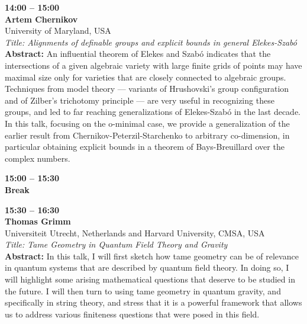 \documentclass[10pt,a4paper]{article}
\begin{document}
\begin{tcolorbox}[talkbox]
\textbf{14:00 -- 15:00} \\
\textbf{Artem Chernikov} \\
University of Maryland, USA \\
\textit{Title: Alignments of definable groups and explicit bounds in general Elekes-Szabó} \\
\textbf{Abstract:} An influential theorem of Elekes and Szabó indicates that the intersections of a given algebraic variety with large finite grids of points may have maximal size only for varieties that are closely connected to algebraic groups.  Techniques from model theory --- variants of Hrushovski's group configuration and of Zilber's trichotomy principle --- are very useful in recognizing these groups, and led to far reaching generalizations of Elekes-Szabó in the last decade. In this talk, focusing on the o-minimal case, we provide a generalization of the earlier result from Chernikov-Peterzil-Starchenko to arbitrary co-dimension, in particular obtaining explicit bounds in a theorem of Bays-Breuillard over the complex numbers.
\end{tcolorbox}
\begin{tcolorbox}[talkbox]
\textbf{15:00 -- 15:30} \\
\textbf{Break}
\end{tcolorbox}
\begin{tcolorbox}[talkbox]
\textbf{15:30 -- 16:30} \\
\textbf{Thomas Grimm} \\
Universiteit Utrecht, Netherlands and Harvard University, CMSA, USA \\
\textit{Title: Tame Geometry in Quantum Field Theory and Gravity} \\
\textbf{Abstract:} In this talk, I will first sketch how tame geometry can be of relevance in quantum systems that are described by quantum field theory. In doing so, I will highlight some arising mathematical questions that deserve to be studied in the future. I will then turn to using tame geometry in quantum gravity, and specifically in string theory, and stress that it is a powerful framework that allows us to address various finiteness questions that were posed in this field. 
\end{tcolorbox}
\end{document}
